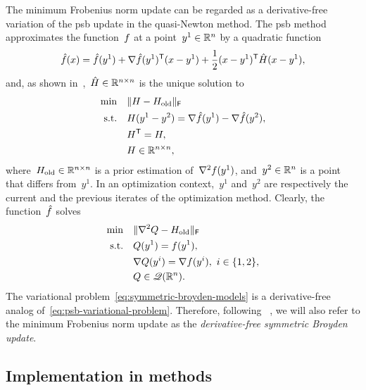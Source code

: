 The minimum Frobenius norm update can be regarded as a derivative-free variation of the \gls{psb} update in the quasi-Newton method.
The \gls{psb} method~\cite{Powell_1970b} approximates the function~$f$ at a point~$y^1 \in \mathbb{R}^n$ by a quadratic function
\begin{align*}
    \objm(\iter) = \objm(y^1) + \nabla \objm(y^1)^{\T} (\iter - y^1) + \frac{1}{2} (\iter - y^1)^{\T} \hat{H} (\iter - y^1),
\end{align*}
and, as shown in~\cite[Thm.~4.2]{Dennis_Schnabel_1979},~$\hat{H} \in \mathbb{R}^{n \times n}$ is the unique solution to
\begin{align*}
    \min        & \quad \norm{H - H_{\text{old}}}_{\mathsf{F}}\\
    \text{s.t.} & \quad H (y^1 - y^2) = \nabla \objm(y^1) - \nabla \objm(y^2),\\
                & \quad H^{\T} = H,\\
                & \quad H \in \R^{n \times n},
\end{align*}
where~$H_{\text{old}} \in \mathbb{R}^{n \times n}$ is a prior estimation of~$\nabla^2 f(y^1)$, and~$y^2 \in \mathbb{R}^n$ is a point that differs from~$y^1$.
In an optimization context,~$y^1$ and~$y^2$ are respectively the current and the previous iterates of the optimization method.
Clearly, the function~$\objm$ solves
\begin{subequations}
    \label{eq:psb-variational-problem}
    \begin{align}
        \min        & \quad \lVert\nabla^2 Q - H_{\text{old}}\rVert_{\mathsf{F}}\\
        \text{s.t.} & \quad Q(y^1) = f(y^1),\\
                    & \quad \nabla Q(y^i) = \nabla f(y^i), ~ i \in \{1, 2\},\\
                    & \quad Q \in \mathscr{Q}(\mathbb{R}^n).
    \end{align}
\end{subequations}
The variational problem~\cref{eq:symmetric-broyden-models} is a derivative-free analog of~\cref{eq:psb-variational-problem}.
Therefore, following \citeauthor{Powell_2013}~\cite{Powell_2013}, we will also refer to the minimum Frobenius norm update as the \emph{derivative-free symmetric Broyden update}.

\subsection{Implementation in  methods}
\label{subsec:implementation-symmetric-broyden-update}

